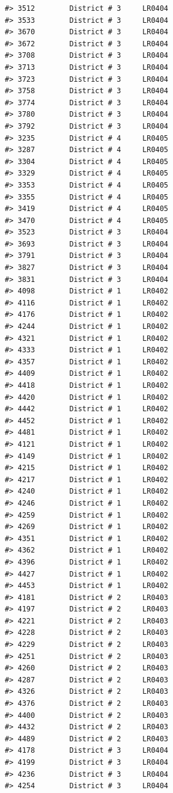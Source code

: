 \documentclass[12pt,a4paper]{book}
\theoremstyle{definition}
\theoremstyle{definition}
\theoremstyle{definition}
\theoremstyle{remark}
\begin{document}
\begin{verbatim}
#> 3512        District # 3     LR0404
#> 3533        District # 3     LR0404
#> 3670        District # 3     LR0404
#> 3672        District # 3     LR0404
#> 3708        District # 3     LR0404
#> 3713        District # 3     LR0404
#> 3723        District # 3     LR0404
#> 3758        District # 3     LR0404
#> 3774        District # 3     LR0404
#> 3780        District # 3     LR0404
#> 3792        District # 3     LR0404
#> 3235        District # 4     LR0405
#> 3287        District # 4     LR0405
#> 3304        District # 4     LR0405
#> 3329        District # 4     LR0405
#> 3353        District # 4     LR0405
#> 3355        District # 4     LR0405
#> 3419        District # 4     LR0405
#> 3470        District # 4     LR0405
#> 3523        District # 3     LR0404
#> 3693        District # 3     LR0404
#> 3791        District # 3     LR0404
#> 3827        District # 3     LR0404
#> 3831        District # 3     LR0404
#> 4098        District # 1     LR0402
#> 4116        District # 1     LR0402
#> 4176        District # 1     LR0402
#> 4244        District # 1     LR0402
#> 4321        District # 1     LR0402
#> 4333        District # 1     LR0402
#> 4357        District # 1     LR0402
#> 4409        District # 1     LR0402
#> 4418        District # 1     LR0402
#> 4420        District # 1     LR0402
#> 4442        District # 1     LR0402
#> 4452        District # 1     LR0402
#> 4481        District # 1     LR0402
#> 4121        District # 1     LR0402
#> 4149        District # 1     LR0402
#> 4215        District # 1     LR0402
#> 4217        District # 1     LR0402
#> 4240        District # 1     LR0402
#> 4246        District # 1     LR0402
#> 4259        District # 1     LR0402
#> 4269        District # 1     LR0402
#> 4351        District # 1     LR0402
#> 4362        District # 1     LR0402
#> 4396        District # 1     LR0402
#> 4427        District # 1     LR0402
#> 4453        District # 1     LR0402
#> 4181        District # 2     LR0403
#> 4197        District # 2     LR0403
#> 4221        District # 2     LR0403
#> 4228        District # 2     LR0403
#> 4229        District # 2     LR0403
#> 4251        District # 2     LR0403
#> 4260        District # 2     LR0403
#> 4287        District # 2     LR0403
#> 4326        District # 2     LR0403
#> 4376        District # 2     LR0403
#> 4400        District # 2     LR0403
#> 4432        District # 2     LR0403
#> 4489        District # 2     LR0403
#> 4178        District # 3     LR0404
#> 4199        District # 3     LR0404
#> 4236        District # 3     LR0404
#> 4254        District # 3     LR0404

\end{verbatim}
\end{document}
